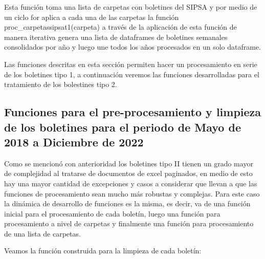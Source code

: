 \documentclass[
]{book}
\begin{document}
Esta función toma una lista de carpetas con boletines del SIPSA y por medio de un ciclo for aplica a cada una de las carpetas la función proc\_carpetassipsat1(carpeta) a través de la aplicación de esta función de manera iterativa genera una lista de dataframes de boletines semanales consolidados por año y luego une todos los años procesados en un solo dataframe.

Las funciones descritas en esta sección permiten hacer un procesamiento en serie de los boletines tipo 1, a continuación veremos las funciones desarrolladas para el tratamiento de los bolestines tipo 2.

\hypertarget{funciones-para-el-pre-procesamiento-y-limpieza-de-los-boletines-para-el-periodo-de-mayo-de-2018-a-diciembre-de-2022}{%
\subsection{Funciones para el pre-procesamiento y limpieza de los boletines para el periodo de Mayo de 2018 a Diciembre de 2022}\label{funciones-para-el-pre-procesamiento-y-limpieza-de-los-boletines-para-el-periodo-de-mayo-de-2018-a-diciembre-de-2022}}

Como se mencionó con anterioridad los boletines tipo II tienen un grado mayor de complejidad al tratarse de documentos de excel paginados, en medio de esto hay una mayor cantidad de excepciones y casos a considerar que llevan a que las funciones de procesamiento sean mucho más robustas y complejas. Para este caso la dinámica de desarrollo de funciones es la misma, es decir, va de una función inicial para el procesamiento de cada boletín, luego una función para procesamiento a nivel de carpetas y finalmente una función para procesamiento de una lista de carpetas.

Veamos la función construida para la limpieza de cada boletín:
\end{document}
